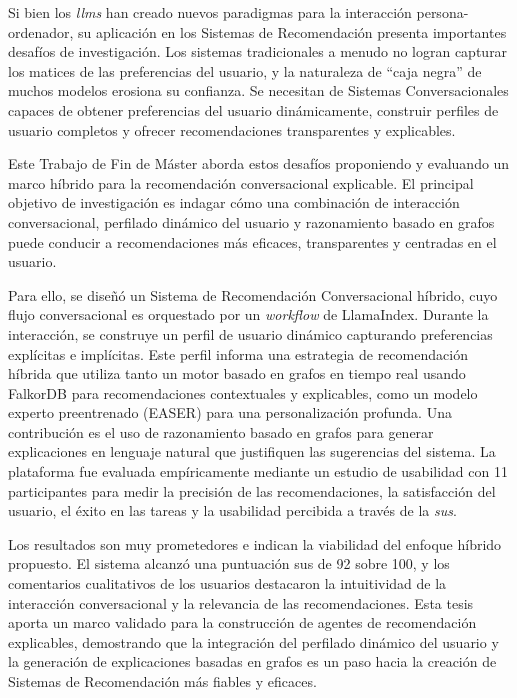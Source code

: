 Si bien los \textit{\acp{llm}} han creado nuevos paradigmas para la interacción persona-ordenador, su aplicación en los Sistemas de Recomendación presenta importantes desafíos de investigación. Los sistemas tradicionales a menudo no logran capturar los matices de las preferencias del usuario, y la naturaleza de ``caja negra'' de muchos modelos erosiona su confianza. Se necesitan de Sistemas Conversacionales capaces de obtener preferencias del usuario dinámicamente, construir perfiles de usuario completos y ofrecer recomendaciones transparentes y explicables.

Este Trabajo de Fin de Máster aborda estos desafíos proponiendo y evaluando un marco híbrido para la recomendación conversacional explicable. El principal objetivo de investigación es indagar cómo una combinación de interacción conversacional, perfilado dinámico del usuario y razonamiento basado en grafos puede conducir a recomendaciones más eficaces, transparentes y centradas en el usuario.

Para ello, se diseñó un Sistema de Recomendación Conversacional híbrido, cuyo flujo conversacional es orquestado por un \textit{workflow} de LlamaIndex. Durante la interacción, se construye un perfil de usuario dinámico capturando preferencias explícitas e implícitas. Este perfil informa una estrategia de recomendación híbrida que utiliza tanto un motor basado en grafos en tiempo real usando FalkorDB para recomendaciones contextuales y explicables, como un modelo experto preentrenado (EASER) para una personalización profunda. Una contribución es el uso de razonamiento basado en grafos para generar explicaciones en lenguaje natural que justifiquen las sugerencias del sistema. La plataforma fue evaluada empíricamente mediante un estudio de usabilidad con 11 participantes para medir la precisión de las recomendaciones, la satisfacción del usuario, el éxito en las tareas y la usabilidad percibida a través de la \textit{\ac{sus}}.

Los resultados son muy prometedores e indican la viabilidad del enfoque híbrido propuesto. El sistema alcanzó una puntuación \acs{sus} de 92 sobre 100, y los comentarios cualitativos de los usuarios destacaron la intuitividad de la interacción conversacional y la relevancia de las recomendaciones. Esta tesis aporta un marco validado para la construcción de agentes de recomendación explicables, demostrando que la integración del perfilado dinámico del usuario y la generación de explicaciones basadas en grafos es un paso hacia la creación de Sistemas de Recomendación más fiables y eficaces.

